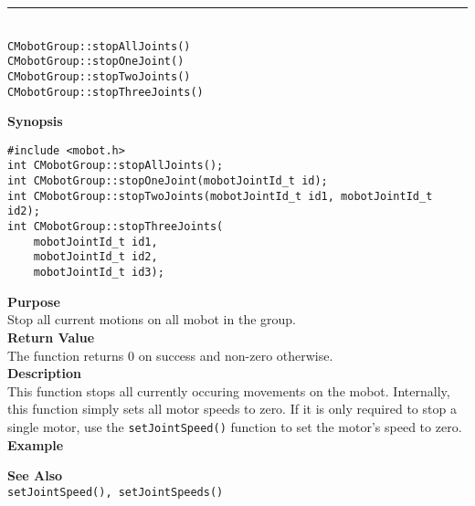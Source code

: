 \noindent
\vspace{5pt}
\rule{4.5in}{0.015in}\\
\noindent
{\LARGE \texttt{CMobotGroup::stopAllJoints()}}\\
{\LARGE \texttt{CMobotGroup::stopOneJoint()}}\\
{\LARGE \texttt{CMobotGroup::stopTwoJoints()}}\\
{\LARGE \texttt{CMobotGroup::stopThreeJoints()}}\\
{}

\noindent
{\bf Synopsis}
\vspace{-8pt}
\begin{verbatim}
#include <mobot.h>
int CMobotGroup::stopAllJoints();
int CMobotGroup::stopOneJoint(mobotJointId_t id);
int CMobotGroup::stopTwoJoints(mobotJointId_t id1, mobotJointId_t id2);
int CMobotGroup::stopThreeJoints(
    mobotJointId_t id1,
    mobotJointId_t id2,
    mobotJointId_t id3);
\end{verbatim}

\noindent
{\bf Purpose}\\
Stop all current motions on all mobot in the group.\\

\noindent
{\bf Return Value}\\
The function returns 0 on success and non-zero otherwise.\\

\noindent
{\bf Description}\\
This function stops all currently occuring movements on the mobot. Internally, this function simply sets all motor speeds to zero. If it is only required to stop a single motor, use the 
\texttt{setJointSpeed()} function to set the motor's speed to zero. \\

\noindent
{\bf Example}\\
\noindent

\noindent
{\bf See Also}\\
\texttt{setJointSpeed(), setJointSpeeds()}

